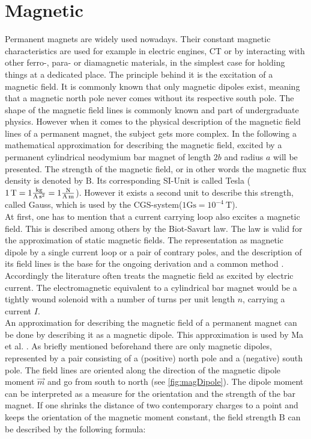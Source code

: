 \FloatBarrier

\section{Magnetic} \label{sec:magneticFound}
Permanent magnets are widely used nowadays. Their constant magnetic characteristics are used for example in electric engines, \ac{CT} or by interacting with other ferro-, para- or diamagnetic materials, in the simplest case for holding things at a dedicated place. The principle behind it is the excitation of a magnetic field. It is commonly known that only magnetic dipoles exist, meaning that a magnetic north pole never comes without its respective south pole. The shape of the magnetic field lines is commonly known and part of undergraduate physics. However when it comes to the physical description of the magnetic field lines of a permanent magnet, the subject gets more complex. In the following a mathematical approximation for describing the magnetic field, excited by a permanent cylindrical neodymium bar magnet of length $ 2b $ and radius $ a $ will be presented. The strength of the magnetic field, or in other words the magnetic flux density is denoted by $ \mathrm{B} $. Its corresponding SI-Unit is called Tesla ($ \SI{1}{\tesla} = 1 \si[per-mode=fraction]{\kilogram \per \ampere \per \second \squared} = 1 \si[per-mode=fraction]{\newton \per \ampere \per \meter}$). However it exists a second unit to describe this strength, called Gauss, which is used by the \ac{CGS}-system($ 1 \mathrm{Gs} = 10^{-4}\SI{}{\tesla} $). \\
At first, one has to mention that a current carrying loop also excites a magnetic field. This is described among others by the Biot-Savart law. The law is valid for the approximation of static magnetic fields. The representation as magnetic dipole by a single current loop or a pair of contrary poles, and the description of its field lines is the base for the ongoing derivation and a common method \cite{derby2010cylindrical}. Accordingly the literature often treats the magnetic field as excited by electric current. The electromagnetic equivalent to a cylindrical bar magnet would be a tightly wound solenoid with a number of turns per unit length $ n $, carrying a current $ I $.\\
An approximation for describing the magnetic field of a permanent magnet can be done by describing it as a magnetic dipole. This approximation is used by Ma et al. \cite{ma2010magnetic}. As briefly mentioned beforehand there are only magnetic dipoles, represented by a pair consisting of a (positive) north pole and a (negative) south pole. The field lines are oriented along the direction of the magnetic dipole moment $ \vec{m} $ and go from south to north (see \ref{fig:magDipole}). The dipole moment can be interpreted as a measure for the orientation and the strength of the bar magnet. If one shrinks the distance of two contemporary charges to a point and keeps the orientation of the magnetic moment constant, the field strength $ \mathrm{B} $ can be described by the following formula:
